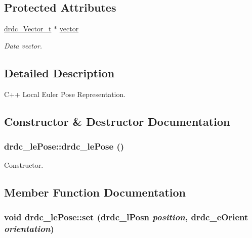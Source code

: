 \subsection*{Protected Attributes}
\begin{CompactItemize}
\item 
\hyperlink{structdrdc__Vector__t}{drdc\_\-Vector\_\-t} $\ast$ \hyperlink{classdrdc__lePose_a9f132c5bcd64f4d09aed98b9c25ef53}{vector}
\begin{CompactList}\small\item\em Data vector. \item\end{CompactList}\end{CompactItemize}


\subsection{Detailed Description}
C++ Local Euler Pose Representation. 



\subsection{Constructor \& Destructor Documentation}
\hypertarget{classdrdc__lePose_86555e5e034ed0c4410b01cb4727117f}{
\subsubsection[drdc\_\-lePose]{\setlength{\rightskip}{0pt plus 5cm}drdc\_\-lePose::drdc\_\-lePose ()}}
\label{classdrdc__lePose_86555e5e034ed0c4410b01cb4727117f}


Constructor. 



\subsection{Member Function Documentation}
\hypertarget{classdrdc__lePose_a74506b729f79df9cef6bb3607709496}{
\subsubsection[set]{\setlength{\rightskip}{0pt plus 5cm}void drdc\_\-lePose::set ({\bf drdc\_\-lPosn} {\em position}, \/  {\bf drdc\_\-eOrient} {\em orientation})}}
\label{classdrdc__lePose_a74506b729f79df9cef6bb3607709496}


